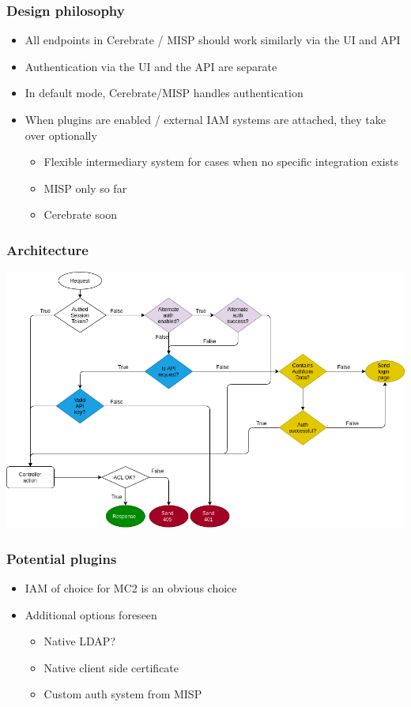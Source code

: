 \begin{frame}
  \frametitle{Design philosophy}
  \begin{itemize}
      \item All endpoints in Cerebrate / MISP should work similarly via the UI and API
      \item Authentication via the UI and the API are separate
      \item In default mode, Cerebrate/MISP handles authentication
      \item When plugins are enabled / external IAM systems are attached, they take over optionally
      \begin{itemize}
          \item Flexible intermediary system for cases when no specific integration exists
          \item MISP only so far
          \item Cerebrate soon
      \end{itemize}
  \end{itemize}
\end{frame}

\begin{frame}
  \frametitle{Architecture}
  \begin{center}
    \includegraphics[scale=0.33]{Authentication.png}
  \end{center}
\end{frame}


\begin{frame}
  \frametitle{Potential plugins}
  \begin{itemize}
    \item IAM of choice for MC2 is an obvious choice
    \item Additional options foreseen
    \begin{itemize}
      \item Native LDAP?
      \item Native client side certificate
      \item Custom auth system from MISP
    \end{itemize}
  \end{itemize}
\end{frame}

